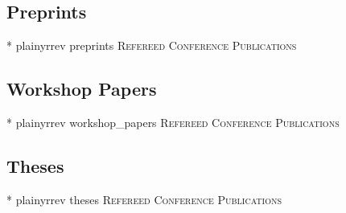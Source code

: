 \documentclass[10pt,a4paper,sans]{moderncv} %
\begin{document}
\subsection{Preprints}
\nocite{preprints}{*}
{plainyrrev}
{preprints}
{\large \textsc{Refereed Conference Publications}}

\subsection{Workshop Papers}
\nocite{workshop_papers}{*}
{plainyrrev}
{workshop_papers}
{\large \textsc{Refereed Conference Publications}}

\subsection{Theses}
\nocite{theses}{*}
{plainyrrev}
{theses}
{\large \textsc{Refereed Conference Publications}}


\end{document}
